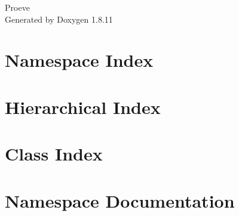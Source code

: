\documentclass[twoside]{book}
\newcommand{\+}{\discretionary{\mbox{\scriptsize$\hookleftarrow$}}{}{}}
\newcommand{\clearemptydoublepage}{%
  \newpage{\pagestyle{empty}\cleardoublepage}%
}
\begin{document}
\hypersetup{pageanchor=false,
             bookmarksnumbered=true,
             pdfencoding=unicode
            }
\begin{titlepage}
\vspace*{7cm}
\begin{center}%
{\Large Proeve }\\
\vspace*{1cm}
{\large Generated by Doxygen 1.8.11}\\
\end{center}
\end{titlepage}
\clearemptydoublepage
\tableofcontents
\clearemptydoublepage
{}
\hypersetup{pageanchor=true}

\chapter{Namespace Index}

\chapter{Hierarchical Index}

\chapter{Class Index}

\chapter{Namespace Documentation}



\end{document}
